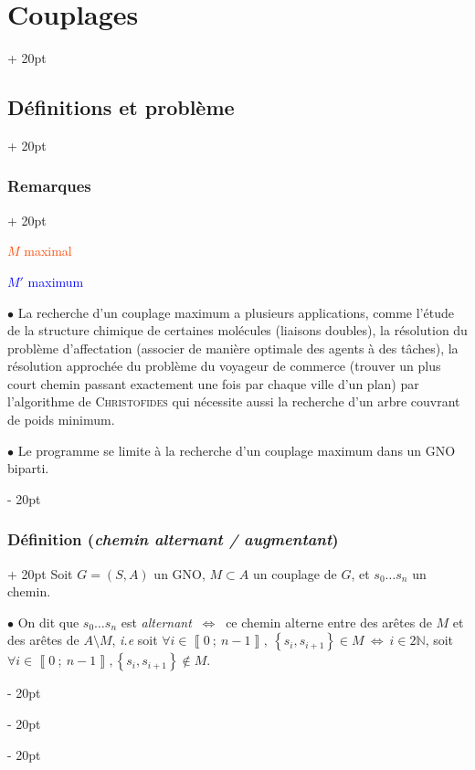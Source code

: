 \documentclass[a4paper, 12pt, twoside]{article}
\newcommand{\N}{\mathbb{N}} %
\newcommand{\nset}[2]{\left\llbracket #1\ ;\ #2 \right\rrbracket}
\newcommand{\set}[1]{\left\{ #1 \right\}}
\newcommand{\ssi}{\ \Leftrightarrow \ }
\newcommand{\ind}[1][20pt]{\advance\leftskip + #1}
\newcommand{\deind}[1][20pt]{\advance\leftskip - #1}
\newenvironment{indt}[2][20pt]{#2 \par \ind[#1]}{\par \deind} %
\begin{document}
\begin{indt}{\section{Couplages}}
\begin{indt}{\subsection{Définitions et problème}}
\begin{indt}{\subsubsection{Remarques}}
\begin{center}
                \end{center}

                \textcolor{ff4500}{$M$ maximal}

                \textcolor{blue}{$M'$ maximum}

                \vspace{12pt}
                
                $\bullet$ La recherche d'un couplage maximum a plusieurs applications, comme l'étude de la structure chimique de certaines molécules (liaisons doubles), la résolution du problème d'affectation (associer de manière optimale des agents à des tâches), la résolution approchée du problème du voyageur de commerce (trouver un plus court chemin passant exactement une fois par chaque ville d'un plan) par l'algorithme de \textsc{Christofides} qui nécessite aussi la recherche d'un arbre couvrant de poids minimum.

                \vspace{6pt}
                
                $\bullet$ Le programme se limite à la recherche d'un couplage maximum dans un GNO biparti.
            \end{indt}

            \vspace{12pt}
            
            \begin{indt}{\subsubsection{Définition (\textit{chemin alternant / augmentant})}}
                Soit $G = (S, A)$ un GNO, $M \subset A$ un couplage de $G$, et $s_0 \ldots s_n$ un chemin.

                \vspace{6pt}
                
                $\bullet$ On dit que $s_0 \ldots s_n$ est \textit{alternant} $\ssi$ ce chemin alterne entre des arêtes de $M$ et des arêtes de $A \setminus M$, \textit{i.e} soit $\forall i \in \nset 0 {n - 1},\ \set{s_i, s_{i + 1}} \in M \ssi i \in 2\N$, soit $\forall i \in \nset 0 {n - 1}, \set{s_i, s_{i + 1}} \notin M$.


\end{indt}
\end{indt}
\end{indt}
\end{document}
